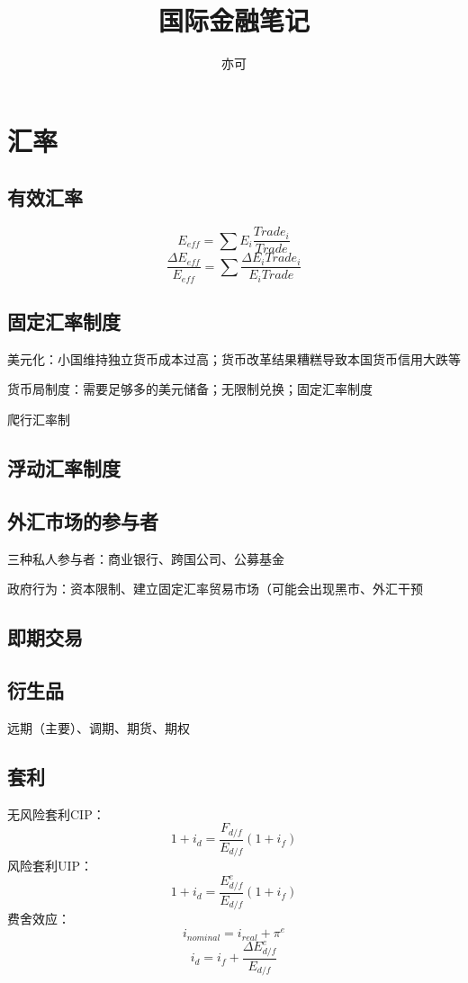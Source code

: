 \documentclass[a4paper, 10pt]{article}
\begin{document}
  \title{国际金融笔记}
  \author{亦可}
  \maketitle
\section{汇率}
\subsection{有效汇率}
$$E_{eff}=\sum E_i\frac{Trade_i}{Trade}$$
$$\frac{\Delta E_{eff}}{E_{eff}}=\sum \frac{\Delta E_iTrade_i}{E_iTrade}$$

\subsection{固定汇率制度}
\noindent 美元化：小国维持独立货币成本过高；货币改革结果糟糕导致本国货币信用大跌等

\noindent 货币局制度：需要足够多的美元储备；无限制兑换；固定汇率制度

\noindent 爬行汇率制


\subsection{浮动汇率制度}

\subsection{外汇市场的参与者}
\noindent 三种私人参与者：商业银行、跨国公司、公募基金

\noindent 政府行为：资本限制、建立固定汇率贸易市场（可能会出现黑市、外汇干预

\subsection{即期交易}
\subsection{衍生品}
\noindent 远期（主要）、调期、期货、期权
\subsection{套利}
\noindent 无风险套利CIP：
$$1+i_d=\frac{F_{d/f}}{E_{d/f}}(1+i_f)$$
风险套利UIP：
$$1+i_d=\frac{E^e_{d/f}}{E_{d/f}}(1+i_f)$$
费舍效应：
$$i_{nominal}=i_{real}+\pi ^e$$
$$i_d=i_f+\frac{\Delta E^e_{d/f}}{E_{d/f}}$$
\end{document}
